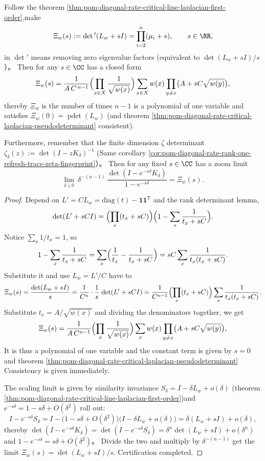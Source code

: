 \begin{theorem}\label{thm:pom-diagonal-rate-critical-xi-polynomial-and-zeta-scaling}
Follow the theorem \ref{thm:pom-diagonal-rate-critical-line-laplacian-first-order},make
\[
\Xi_w(s):=\det{}'(L_w+sI)=\prod_{i=2}^{n}(\mu_i+s),\qquad s\in\RR,
\]
in \(\det{}'\) means removing zero eigenvalue factors (equivalent to \(\det(L_w+sI)/s\)）。
Then for any \(s\in\CC\) has a closed form
\[
\Xi_w(s)
=\frac{1}{A\,C^{\,n-1}}\Bigl(\prod_{x\in X}\frac{1}{\sqrt{w(x)}}\Bigr)
\sum_{x\in X} w(x)\prod_{y\ne x}\bigl(A+sC\sqrt{w(y)}\bigr),
\]
thereby \(\Xi_w\) is the number of times \(n-1\) is a polynomial of one variable and satisfies \(\Xi_w(0)=\operatorname{pdet}(L_w)\) (and theorem \ref{thm:pom-diagonal-rate-critical-laplacian-pseudodeterminant} consistent).
\par
Furthermore, remember that the finite dimension \(\zeta\) determinant
\(
\zeta_\delta(z):=\det(I-zK_\delta)^{-1}
\)
(Same corollary \ref{cor:pom-diagonal-rate-rank-one-refresh-trace-zeta-fingerprint}）。
Then for any fixed \(s\in\CC\) has a zoom limit
\[
\lim_{\delta\downarrow 0}\ \delta^{-(n-1)}\,
\frac{\det(I-e^{-s\delta}K_\delta)}{1-e^{-s\delta}}
=\Xi_w(s).
\]
\end{theorem}
\begin{proof}
Depend on \(L'=CL_w=\mathrm{diag}(t)-\mathbf 1\mathbf 1^{\mathsf T}\) and the rank determinant lemma,
\[
\det(L'+sCI)
=\Bigl(\prod_x(t_x+sC)\Bigr)\Bigl(1-\sum_x\frac{1}{t_x+sC}\Bigr).
\]
Notice \(\sum_x 1/t_x=1\), so
\[
1-\sum_x\frac{1}{t_x+sC}
=\sum_x\Bigl(\frac{1}{t_x}-\frac{1}{t_x+sC}\Bigr)
=sC\sum_x\frac{1}{t_x(t_x+sC)}.
\]
Substitute it and use \(L_w=L'/C\) have to
\[
\Xi_w(s)=\frac{\det(L_w+sI)}{s}
=\frac{1}{C^{n}}\cdot \frac{1}{s}\,\det(L'+sCI)
=\frac{1}{C^{n-1}}\Bigl(\prod_x(t_x+sC)\Bigr)\sum_x\frac{1}{t_x(t_x+sC)}.
\]
Substitute \(t_x=A/\sqrt{w(x)}\) and dividing the denominators together, we get
\[
\Xi_w(s)=\frac{1}{A\,C^{n-1}}\Bigl(\prod_{x}\frac{1}{\sqrt{w(x)}}\Bigr)\sum_{x}w(x)\prod_{y\ne x}\bigl(A+sC\sqrt{w(y)}\bigr),
\]
It is thus a polynomial of one variable and the constant term is given by \(s=0\) and theorem \ref{thm:pom-diagonal-rate-critical-laplacian-pseudodeterminant} Consistency is given immediately.
\par
The scaling limit is given by similarity invariance
\(
S_\delta=I-\delta L_w+o(\delta)
\)
(theorem \ref{thm:pom-diagonal-rate-critical-line-laplacian-first-order})and
\(
e^{-s\delta}=1-s\delta+O(\delta^2)
\)
roll out:
\[
I-e^{-s\delta}S_\delta
=I-\bigl(1-s\delta+O(\delta^2)\bigr)\bigl(I-\delta L_w+o(\delta)\bigr)
=\delta(L_w+sI)+o(\delta),
\]
thereby
\(
\det(I-e^{-s\delta}K_\delta)=\det(I-e^{-s\delta}S_\delta)=\delta^{n}\det(L_w+sI)+o(\delta^{n})
\)
and
\(
1-e^{-s\delta}=s\delta+O(\delta^2)
\)。
Divide the two and multiply by \(\delta^{-(n-1)}\) get the limit \(\Xi_w(s)=\det(L_w+sI)/s\). Certification completed.
\end{proof}

